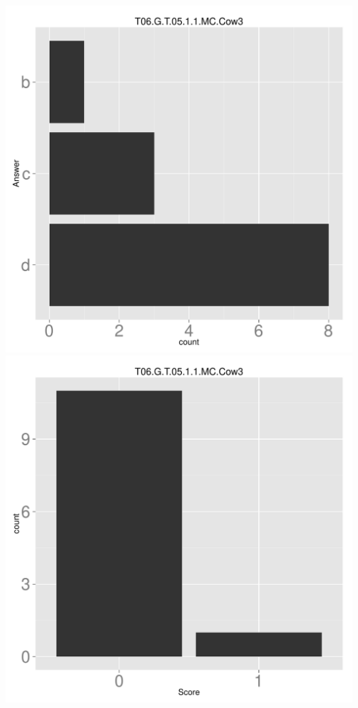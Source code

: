 \documentclass[12pt,english,nohyper]{tufte-handout}\usepackage[]{graphicx}\usepackage[]{color}
\begin{document}
\begin{center} \includegraphics[width=.45\linewidth]{Topic06_AB_84_answer} \includegraphics[width=.45\linewidth]{Topic06_AB_84_score} \end{center} 
\end{document}
